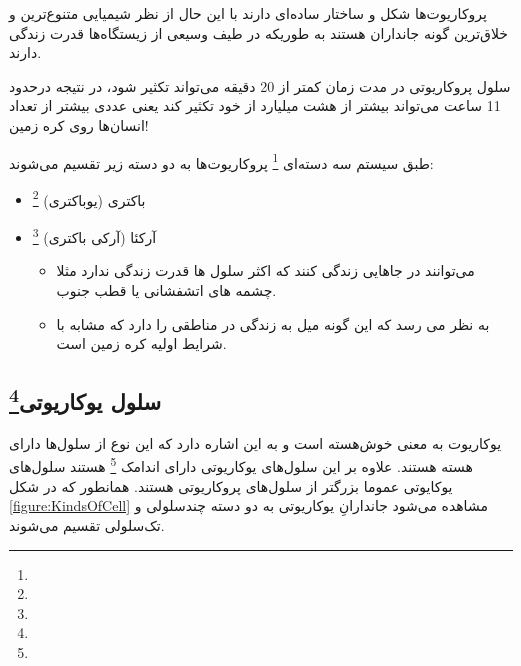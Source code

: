 پروکاریوت‌ها شکل و ساختار ساده‌ای دارند با این حال از نظر شیمیایی متنوع‌ترین و خلاق‌ترین گونه جانداران هستند به طوریکه در طیف وسیعی از زیستگاه‌ها قدرت زندگی دارند.

\noindent
سلول پروکاریوتی در مدت زمان کمتر از 20 دقیقه می‌تواند تکثیر شود، در نتیجه درحدود 11 ساعت می‌تواند بیشتر از هشت میلیارد از خود تکثیر کند یعنی عددی بیشتر از تعداد انسان‌ها روی کره زمین!

\noindent
طبق سیستم ‌سه ‌دسته‌ای
\footnote{}
پروکاریوت‌ها به دو دسته زیر تقسیم می‌شوند:

\begin{itemize}
\item باکتری (یوباکتری)
\footnote{}
\item آرکئا (آرکی باکتری) 
\footnote{}
	\begin{itemize}
	\item
	می‌توانند در جاهایی زندگی کنند که اکثر سلول ها قدرت زندگی ندارد مثلا چشمه های اتشفشانی یا قطب جنوب.
	\item
	به نظر می رسد که این گونه میل به زندگی در مناطقی را دارد که مشابه با شرایط اولیه کره زمین است. 	
	\end{itemize}
\end{itemize}

\subsection{سلول یوکاریوتی\protect\footnote{}}

یوکاریوت به معنی خوش‌هسته است و به این اشاره دارد که این نوع از سلول‌ها دارای هسته هستند. علاوه بر این سلول‌های یوکاریوتی دارای اندامک
\footnote{}
هستند
سلول‌های یوکایوتی عموما بزرگتر از سلول‌های پروکاریوتی هستند.
همانطور که در شکل
\ref{figure:KindsOfCell}
مشاهده می‌شود جاندارانِ یوکاریوتی به دو دسته چند‌سلولی و تک‌سلولی تقسیم می‌شوند.
\pagebreak

